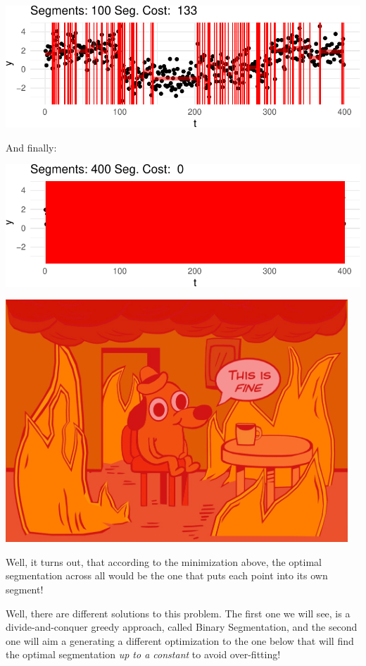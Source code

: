 \documentclass[
  letterpaper,
  DIV=11,
  numbers=noendperiod]{scrreprt}
\begin{document}
\includegraphics{3_multiple_changes_files/figure-pdf/unnamed-chunk-6-2.pdf}

And finally:

\includegraphics{3_multiple_changes_files/figure-pdf/unnamed-chunk-7-1.pdf}

\begin{center}
\includegraphics[width=5.0625in,height=\textheight]{source_imgs/fine.png}
\end{center}

Well, it turns out, that according to the minimization above, the
optimal segmentation across all would be the one that puts each point
into its own segment!

Well, there are different solutions to this problem. The first one we
will see, is a divide-and-conquer greedy approach, called Binary
Segmentation, and the second one will aim a generating a different
optimization to the one below that will find the optimal segmentation
\emph{up to a constant} to avoid over-fitting!
\end{document}
